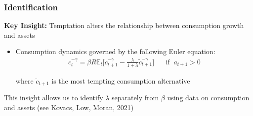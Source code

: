 \documentclass[10pt,english,t,10pt]{beamer}
\begin{document}
\begin{frame}
\frametitle{Identification}

\textbf{Key Insight:} Temptation alters the relationship between consumption growth and assets 


\medskip \medskip
\medskip
\pause

\begin{itemize}

\item Consumption dynamics governed by the following Euler equation:  %
\begin{align*}
c_t^{-\gamma} = \beta R \mathbb{E}_t \Biggr[ c_{t+1}^{-\gamma}  - \frac{ \lambda }{ 1+\lambda }   \tilde{c}_{t+1}^{-\gamma}  \Biggr] \;\;\; \;\;\; \text{if} \;\; a_{t+1} > 0
\end{align*}

where $\tilde{c}_{t+1}$ is the most tempting consumption alternative
%	
%	
%	
%


\medskip \medskip
\medskip

\pause 
\end{itemize}


This insight allows us to identify $\lambda$ separately from $\beta$ using data on consumption and assets (see Kovacs, Low, Moran, 2021)

\end{frame}
\end{document}
